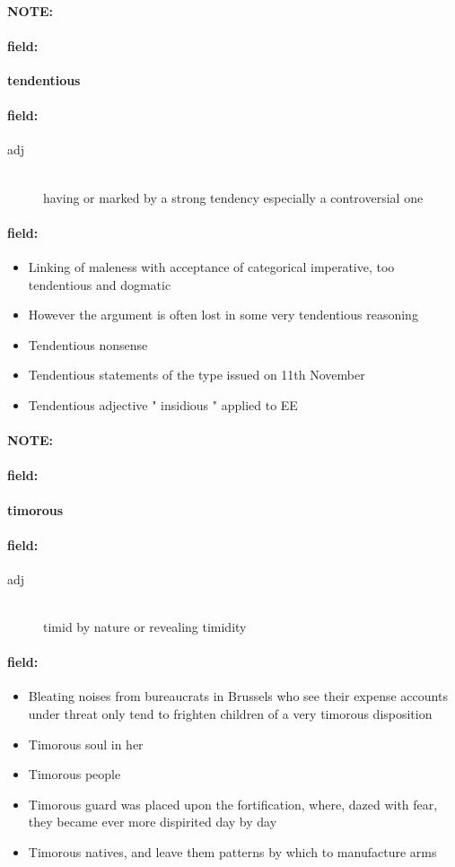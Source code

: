 \documentclass[12pt]{article}
\newenvironment{note}{\paragraph{NOTE:}}{}
\newenvironment{field}{\paragraph{field:}}{}
\begin{document}
\begin{note}
\begin{field}
\textbf{\large tendentious}
\end{field}


\begin{field}
\begin{description}
\item[adj] \hfill \\ 
having or marked by a strong tendency especially a controversial one

\end{description}
\end{field}

\begin{field}
\begin{itemize}
\item Linking of maleness with acceptance of categorical imperative, too tendentious and dogmatic
\item However the argument is often lost in some very tendentious reasoning
\item Tendentious nonsense
\item Tendentious statements of the type issued on 11th November
\item Tendentious adjective " insidious " applied to EE
\end{itemize}
\end{field}
\end{note}
\begin{note}
\begin{field}
\textbf{\large timorous}
\end{field}


\begin{field}
\begin{description}
\item[adj] \hfill \\ 
timid by nature or revealing timidity

\end{description}
\end{field}

\begin{field}
\begin{itemize}
\item Bleating noises from bureaucrats in Brussels who see their expense accounts under threat only tend to frighten children of a very timorous disposition
\item Timorous soul in her
\item Timorous people
\item Timorous guard was placed upon the fortification, where, dazed with fear, they became ever more dispirited day by day
\item Timorous natives, and leave them patterns by which to manufacture arms
\end{itemize}
\end{field}
\end{note}
\end{document}
